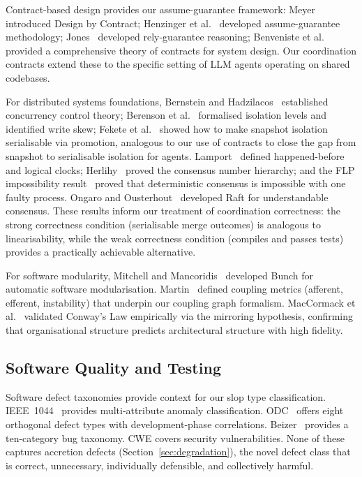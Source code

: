 \documentclass[11pt, a4paper, logo, copyright]{googledeepmind}
\begin{document}
Contract-based design provides our assume-guarantee framework:
Meyer~\citep{Meyer1992} introduced Design by Contract; Henzinger
et al.~\citep{Henzinger2002} developed assume-guarantee methodology;
Jones~\citep{Jones1983} developed rely-guarantee reasoning; Benveniste
et al.~\citep{Benveniste2018} provided a comprehensive theory of contracts for
system design.  Our coordination contracts extend these to the specific setting
of LLM agents operating on shared codebases.

For distributed systems foundations, Bernstein and Hadzilacos~\citep{BernsteinHadzilacos1987} established concurrency control theory; Berenson et al.~\citep{Berenson1995} formalised isolation levels and identified write skew; Fekete et al.~\citep{Fekete2005} showed how to make snapshot isolation serialisable via promotion, analogous to our use of contracts to close the gap from snapshot to serialisable isolation for agents. Lamport~\citep{Lamport1978} defined happened-before and logical clocks; Herlihy~\citep{Herlihy1991} proved the consensus number hierarchy; and the FLP impossibility result~\citep{FLP1985} proved that deterministic consensus is impossible with one faulty process. Ongaro and Ousterhout~\citep{Ongaro2014} developed Raft for understandable consensus. These results inform our treatment of coordination correctness: the strong correctness condition (serialisable merge outcomes) is analogous to linearisability, while the weak correctness condition (compiles and passes tests) provides a practically achievable alternative.

For software modularity, Mitchell and Mancoridis~\citep{Mitchell2006bunch} developed Bunch for automatic software modularisation. Martin~\citep{Martin1994} defined coupling metrics (afferent, efferent, instability) that underpin our coupling graph formalism. MacCormack et al.~\citep{MacCormack2012} validated Conway's Law empirically via the mirroring hypothesis, confirming that organisational structure predicts architectural structure with high fidelity.


\subsection{Software Quality and Testing}

Software defect taxonomies provide context for our slop type classification. IEEE~1044~\citep{ieee1044} provides multi-attribute anomaly classification. ODC~\citep{chillarege1992} offers eight orthogonal defect types with development-phase correlations. Beizer~\citep{beizer1990} provides a ten-category bug taxonomy. CWE covers security vulnerabilities. None of these captures accretion defects (Section~\ref{sec:degradation}), the novel defect class that is correct, unnecessary, individually defensible, and collectively harmful.
\end{document}
